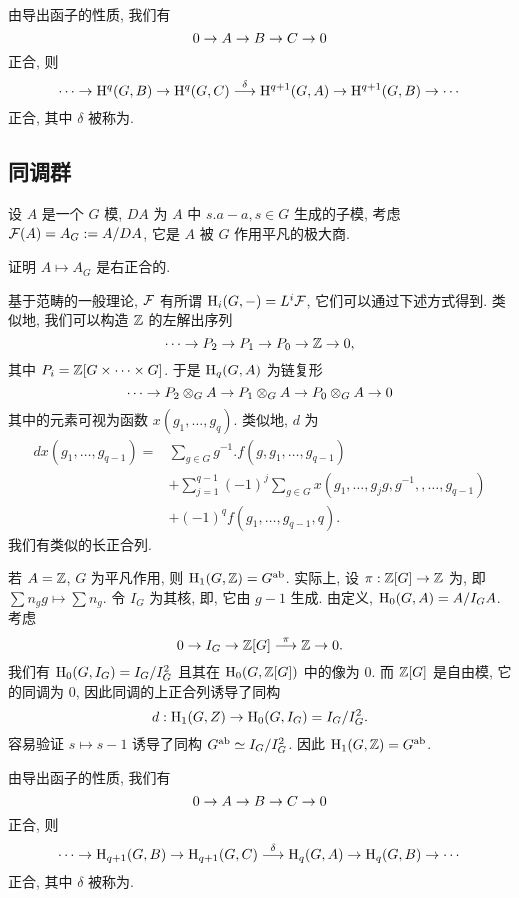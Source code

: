 由导出函子的性质, 我们有
  \[0\rightarrow A\rightarrow B\rightarrow C\rightarrow 0\]
正合, 则
  \[\cdots \rightarrow {\mathrm{H}}^q(G,B)\rightarrow {\mathrm{H}}^q(G,C)\stackrel{\delta}{\longrightarrow} {\mathrm{H}}^{q+1}(G,A)\rightarrow {\mathrm{H}}^{q+1}(G,B)\rightarrow\cdots\]
正合, 其中 $\delta$ 被称为.

\subsection{同调群}
设 $A$ 是一个 $G$ 模, $DA$ 为 $A$ 中 $s.a-a,s\in G$ 生成的子模, 考虑 ${\mathcal{F}}(A)=A_G:=A/DA$, 它是 $A$ 被 $G$ 作用平凡的极大商.

\begin{exercise}
证明 $A\mapsto A_G$ 是右正合的.
\end{exercise}

基于范畴的一般理论, ${\mathcal{F}}$ 有所谓 ${\mathrm{H}}_i(G,-)=L^i{\mathcal{F}}$, 它们可以通过下述方式得到. 类似地, 我们可以构造 ${\mathbb{Z}}$ 的左解出序列
  \[\cdots\rightarrow P_2\rightarrow P_1\rightarrow P_0\rightarrow {\mathbb{Z}}\rightarrow 0,\]
其中 $P_i={\mathbb{Z}}[G\times \cdots\times G]$. 于是 ${\mathrm{H}}_q(G,A)$ 为链复形
  \[\cdots\rightarrow P_2\otimes_G A\rightarrow P_1\otimes_G A\rightarrow P_0\otimes_G A\rightarrow 0\]
其中的元素可视为函数 $x(g_1,\dots,g_q)$. 类似地, $d$ 为
  \[\begin{split}
dx(g_1,\dots,g_{q-1})=&\sum_{g\in G}g^{-1}.f(g,g_1,\dots,g_{q-1})\\
&+\sum_{j=1}^{q-1}(-1)^j \sum_{g\in G}x(g_1,\dots,g_jg,g^{-1},,\dots,g_{q-1})\\
&+(-1)^{q}f(g_1,\dots,g_{q-1},q).
\end{split}\]
我们有类似的长正合列.

若 $A={\mathbb{Z}}$, $G$ 为平凡作用, 则 ${\mathrm{H}}_1(G,{\mathbb{Z}})=G^{\mathrm{ab}}$. 实际上, 设 $\pi:{\mathbb{Z}}[G]\to{\mathbb{Z}}$ 为, 即 $\sum n_g g\mapsto \sum n_g$. 令 $I_G$ 为其核, 即, 它由 $g-1$ 生成. 由定义, ${\mathrm{H}}_0(G,A)=A/I_GA$. 考虑
  \[0\rightarrow I_G\rightarrow {\mathbb{Z}}[G]\stackrel{\pi}{\longrightarrow}{\mathbb{Z}}\rightarrow 0.\]
我们有 ${\mathrm{H}}_0(G,I_G)=I_G/I_G^2$ 且其在 ${\mathrm{H}}_0(G,{\mathbb{Z}}[G])$ 中的像为 $0$. 而 ${\mathbb{Z}}[G]$ 是自由模, 它的同调为 $0$, 因此同调的上正合列诱导了同构
  \[d:{\mathrm{H}}_1(G,Z)\to {\mathrm{H}}_0(G,I_G)=I_G/I_G^2.\]
容易验证 $s\mapsto s-1$ 诱导了同构 $G^{\mathrm{ab}}\simeq I_G/I_G^2$. 因此 ${\mathrm{H}}_1(G,{\mathbb{Z}})=G^{\mathrm{ab}}$.

由导出函子的性质, 我们有
  \[0\rightarrow A\rightarrow B\rightarrow C\rightarrow 0\]
正合, 则
  \[\cdots \rightarrow {\mathrm{H}}_{q+1}(G,B)\rightarrow {\mathrm{H}}_{q+1}(G,C)\stackrel{\delta}{\longrightarrow} {\mathrm{H}}_{q}(G,A)\rightarrow {\mathrm{H}}_{q}(G,B)\rightarrow\cdots\]
正合, 其中 $\delta$ 被称为.

